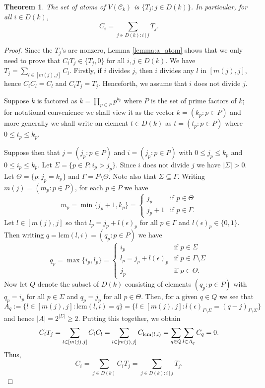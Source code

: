 \documentclass[a4paper, 11pt]{article}
\theoremstyle{plain}
\newtheorem{theorem}{Theorem}[section]
\theoremstyle{definition}
\newcommand{\lcm}       {\mathrm{lcm}}
\begin{document}
\begin{theorem} \label{theorem:Ti_atoms}
The set of atoms of $V( \mathcal{C}_k )$ is $\{ T_j : j \in D(k) \}$. In particular, for all $i \in D(k)$,
\[
    C_i = \sum_{j \in D(k) : i \ | \ j} T_j.
\]

\end{theorem}

\begin{proof} Since the $T_j$'s are nonzero, Lemma \ref{lemma:a_atom} shows that we only need to prove that $C_i T_j \in \{T_j, 0\}$ for all $i,j \in D(k)$.
We have $T_j = \sum_{l \in [m(j), j]} C_l$. Firstly, if $i$ divides $j$, then $i$ divides any $l$ in $[m(j), j]$, hence $C_i C_l = C_l$ and $C_i T_j = T_j$. Henceforth, we assume that $i$ does not divide $j$.


Suppose $k$ is factored as $k = \prod_{p \in P} p^{k_p}$ where $P$ is the set of prime factors of $k$; for notational convenience we shall view it as the vector $k = (k_p : p \in P)$ and more generally we shall write an element $t \in D(k)$ as $t = (t_p : p \in P)$ where $0 \le t_p \le k_p$.

Suppose then that $j = (j_p : p \in P)$ and $i = (j_p : p \in P)$ with $0 \le j_p \le k_p$ and $0 \le i_p \le k_p$. Let $\Sigma = \{ p \in P : i_p > j_p \}$. Since $i$ does not divide $j$ we have $|\Sigma|>0$. Let $\Theta = \{ p : j_p = k_p \}$ and $\Gamma = P \setminus \Theta$. Note also that  $\Sigma \subseteq \Gamma$. Writing $m(j) = (m_p : p \in P)$, for each $p \in P$ we have
\[
    m_p = \min\{ j_p + 1, k_p \} = \begin{cases}
        j_p &\text{if } p \in \Theta \\
        j_p + 1 &\text{if } p \in \Gamma.
    \end{cases}
\]
Let $l \in [m(j),j]$ so that $l_p = j_p + l(\epsilon)_p$ for all $p \in \Gamma$ and $l(\epsilon)_p \in \{0,1\}$. Then writing $q = \lcm(l,i) = (q_p : p \in P)$ we have
\[
    q_p = \max\{ i_p, l_p \} = \begin{cases}
        i_p &\text{if } p \in \Sigma \\
        l_p = j_p + l(\epsilon)_p &\text{if } p \in \Gamma \setminus \Sigma \\
        j_p &\text{if } p \in \Theta.
    \end{cases}
\]
Now let $Q$ denote the subset of $D(k)$ consisting of elements $(q_p: p \in P)$ with $q_p = i_p$ for all $p \in \Sigma$ and $q_p = j_p$ for all $p \in \Theta$.  
Then, for a given $q \in Q$ we see that $$A_q:=\{l \in [m(j), j] : \lcm(l,i) = q\} = \{ l \in [m(j),j] : l(\epsilon)_{\Gamma \setminus \Sigma}  = (q - j)_{\Gamma \setminus \Sigma} \}$$ and hence $|A| = 2^{| \Sigma | } \geq 2$. Putting this together, we obtain
\[
    C_i T_j = \sum_{l \in [m(j), j]} C_iC_l = \sum_{l \in [m(j), j] }C_{{ \rm lcm}(l,i)}  =\sum_{q \in Q} \sum_{l \in A_q} C_q = 0.
\]
Thus, 
\[
    C_i = \sum_{j \in D(k)} C_i T_j =  \sum_{j \in D(k) : i \ | \ j} T_j.
\]
\end{proof}
\end{document}
